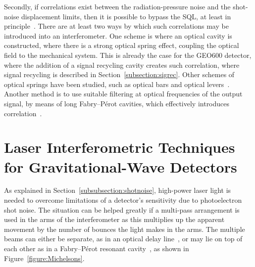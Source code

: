 \documentclass{article}
\begin{document}
Secondly, if correlations exist between the radiation-pressure noise and the
shot-noise displacement limits, then it is possible to bypass the SQL, at least
in principle~\cite{Loudon:1981}.  There are at least two ways by which such
correlations may be introduced into an interferometer.  One scheme is where an
optical cavity is constructed, where there is a strong optical spring effect,
coupling the optical field to the mechanical system.  This is already the case
for the GEO600 detector, where the addition of a signal recycling cavity creates
such correlation, where signal recycling is described in
Section~\ref{subsection:sigrec}. Other schemes of optical springs have been studied,
such as optical bars and optical levers~\cite{Braginsky:1996, Braginsky:1997}.
Another method is to use suitable filtering at optical frequencies of the
output signal, by means of long Fabry--P\'{e}rot cavities, which effectively
introduces correlation~\cite{Kimble:2001, Corbitt:2004}.



\section{Laser Interferometric Techniques for Gravitational-Wave Detectors}
\label{section:interferometry}

As explained in Section~\ref{subsubsection:shotnoise}, high-power laser
light is needed to overcome limitations of a detector's sensitivity due to
photoelectron shot noise. The situation can be helped greatly if a multi-pass
arrangement is used in the arms of the interferometer as this multiplies up the
apparent movement by the number of bounces the light makes in the arms. The
multiple beams can either be separate, as in an optical delay line~\cite{Weiss,
Billing}, or may lie on top of each other as in a Fabry--P\'{e}rot resonant
cavity~\cite{Drever2}, as shown in Figure~\ref{figure:Michelsons}.

\end{document}
